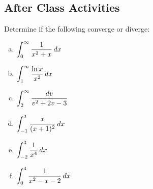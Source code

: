 \documentclass[notes]{subfiles}
\begin{document}
	\subsection*{After Class Activities}
		\begin{ex}
			Determine if the following converge or diverge:
			\begin{enumerate}[(a)]
				\item $\displaystyle \int_0^\infty \dfrac{1}{x^2 + x}\, dx$
					
				\item $\displaystyle \int_1^\infty \dfrac{\ln x}{x^2}\, dx$
					
				\item $\displaystyle \int_2^\infty \dfrac{dv}{v^2 + 2v-3}$
					\newpage
					
				\item $\displaystyle \int_{-1}^2 \dfrac{x}{(x+1)^2}\, dx$	
					
				\item $\displaystyle \int_{-2}^3 \dfrac{1}{x^4}\, dx$
					
				\item $\displaystyle \int_0^4 \dfrac{1}{x^2-x-2}\, dx$
			\end{enumerate}
		\end{ex}
	
\clearpage
\end{document}

